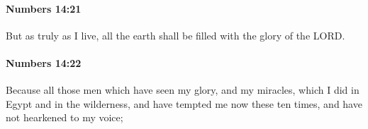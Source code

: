 		\paragraph{Numbers 14:21} %
			\label{NUMBERS-14-21}

			But as truly as I live, all the earth shall be filled with the glory of the LORD.


		\paragraph{Numbers 14:22} %
			\label{NUMBERS-14-22}

			Because all those men which have seen my glory, and my miracles, which I did in Egypt and in the wilderness, and have tempted me now these ten times, and have not hearkened to my voice;


